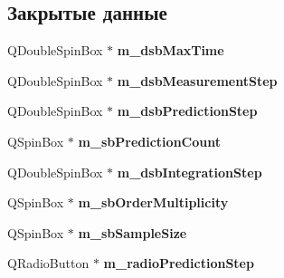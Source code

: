 \subsection*{Закрытые данные}
\begin{DoxyCompactItemize}
\item 
Q\+Double\+Spin\+Box $\ast$ {\bfseries m\+\_\+dsb\+Max\+Time}\hypertarget{class_filter_parameters_widget_ae3037e7e6848fc749764de820841b7fb}{}\label{class_filter_parameters_widget_ae3037e7e6848fc749764de820841b7fb}

\item 
Q\+Double\+Spin\+Box $\ast$ {\bfseries m\+\_\+dsb\+Measurement\+Step}\hypertarget{class_filter_parameters_widget_a7d317d8c6f92d6249cbdc67d6b626393}{}\label{class_filter_parameters_widget_a7d317d8c6f92d6249cbdc67d6b626393}

\item 
Q\+Double\+Spin\+Box $\ast$ {\bfseries m\+\_\+dsb\+Prediction\+Step}\hypertarget{class_filter_parameters_widget_ab24d59b054e38f00b958beca7d4e96ad}{}\label{class_filter_parameters_widget_ab24d59b054e38f00b958beca7d4e96ad}

\item 
Q\+Spin\+Box $\ast$ {\bfseries m\+\_\+sb\+Prediction\+Count}\hypertarget{class_filter_parameters_widget_a3cf102cc0aa0e1fd396d2292a1521dd9}{}\label{class_filter_parameters_widget_a3cf102cc0aa0e1fd396d2292a1521dd9}

\item 
Q\+Double\+Spin\+Box $\ast$ {\bfseries m\+\_\+dsb\+Integration\+Step}\hypertarget{class_filter_parameters_widget_ab4b05c04ba0281a8ead5f20e1b836519}{}\label{class_filter_parameters_widget_ab4b05c04ba0281a8ead5f20e1b836519}

\item 
Q\+Spin\+Box $\ast$ {\bfseries m\+\_\+sb\+Order\+Multiplicity}\hypertarget{class_filter_parameters_widget_a0e9f6b5eb0b6b0e7674ce233d04adcfd}{}\label{class_filter_parameters_widget_a0e9f6b5eb0b6b0e7674ce233d04adcfd}

\item 
Q\+Spin\+Box $\ast$ {\bfseries m\+\_\+sb\+Sample\+Size}\hypertarget{class_filter_parameters_widget_abe75d5ab706fb03c369040b9f59a7f20}{}\label{class_filter_parameters_widget_abe75d5ab706fb03c369040b9f59a7f20}

\item 
Q\+Radio\+Button $\ast$ {\bfseries m\+\_\+radio\+Prediction\+Step}\hypertarget{class_filter_parameters_widget_a6bd5092ef008cb0cf761b508d37930e9}{}\label{class_filter_parameters_widget_a6bd5092ef008cb0cf761b508d37930e9}


\end{DoxyCompactItemize}
